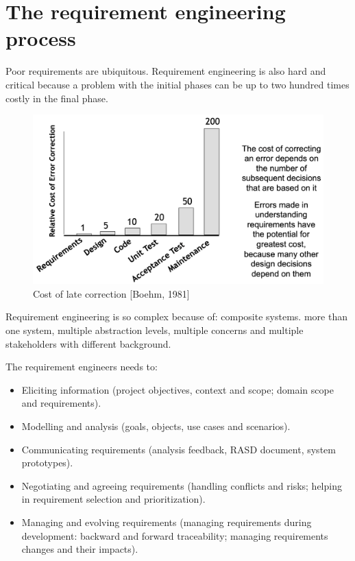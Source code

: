 \documentclass[12pt, a4paper]{report}
\newtheorem[style=M,bodystyle=\normalfont]{theorem}{Theorem}
\newtheorem[style=M,bodystyle=\normalfont]{corollary}{Corollary}
\newtheorem[style=M,bodystyle=\normalfont]{lemma}{Lemma}
\newtheorem[style=M,bodystyle=\normalfont]{definition}{Definition}
\begin{document}
\section{The requirement engineering process}
    Poor requirements are ubiquitous. Requirement engineering is also hard and critical because a problem with the initial phases can be up to two hundred times costly in the final phase. 
    \begin{figure}
        \centering
        \includegraphics[width=1\linewidth]{images/requirements.png}
        \caption{Cost of late correction [Boehm, 1981]}
    \end{figure}
    Requirement engineering is so complex because of: composite systems. more than one system, multiple abstraction levels, multiple concerns and multiple stakeholders with different background.
    \par
    The requirement engineers needs to: 
    \begin{itemize}
        \item Eliciting information (project objectives, context and scope; domain scope and requirements).
        \item Modelling and analysis (goals, objects, use cases and scenarios).
        \item Communicating requirements (analysis feedback, RASD document, system prototypes).
        \item Negotiating and agreeing requirements (handling conflicts and risks; helping in requirement selection and prioritization).
        \item Managing and evolving requirements (managing requirements during development: backward and forward traceability; managing requirements changes and their impacts).
    \end{itemize}
\end{document}
